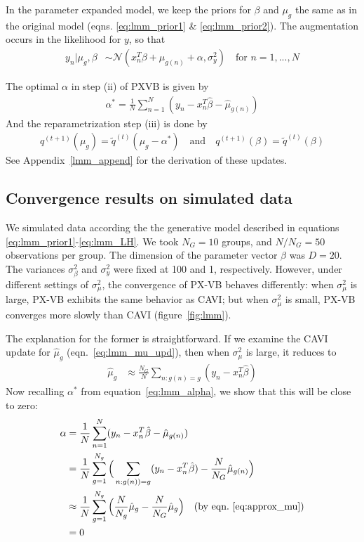\documentclass{article}
\begin{document}
In the parameter expanded model, we keep the priors for $\beta$ and $\mu_g$ the same as in the original model (eqns. \ref{eq:lmm_prior1} \& \ref{eq:lmm_prior2}). The augmentation occurs in the likelihood for $y$, so that
\begin{align}
y_n | \mu_g, \beta &\sim \mathcal N (x_n^T\beta + \mu_{g(n)}+\alpha, \sigma^2_y)\quad \text{for $n = 1, ..., N$} 
\end{align}

The optimal $\alpha$ in step (ii) of PXVB is given by 
\begin{align}
\alpha^* =  \frac{1}{N}\sum_{n=1}^N (y_n - x_n^T\hat\beta - \hat\mu_{g(n)}) \label{eq:lmm_alpha}
\end{align}
And the reparametrization step (iii) is done by 
\begin{align}
    q^{(t+1)}(\mu_g) = \tilde q^{(t)}(\mu_g-\alpha^*) \quad \text{and} \quad q^{(t+1)}(\beta) = \tilde q^{(t)}(\beta)
\end{align}
See Appendix~\ref{lmm_append} for the derivation of these updates. 



\subsection{Convergence results on simulated data}
We simulated data according the the generative model described in equations \ref{eq:lmm_prior1}-\ref{eq:lmm_LH}. We took $N_G = 10$ groups, and $N/N_G = 50$ observations per group. The dimension of the parameter vector $\beta$ was $D = 20$. The variances $\sigma^2_\beta$ and $\sigma^2_y$ were fixed at 100 and 1, respectively. However, under different settings of $\sigma^2_\mu$, the convergence of PX-VB behaves differently: when $\sigma^2_\mu$ is large, PX-VB exhibits the same behavior as CAVI; but when $\sigma^2_\mu$ is small, PX-VB converges more slowly than CAVI (figure~\ref{fig:lmm}). 

The explanation for the former is straightforward. If we examine the CAVI update for $\hat\mu_g$ (eqn.~\ref{eq:lmm_mu_upd}), then when $\sigma^2_\mu$ is large, it reduces to 
\begin{align}
{\hat\mu_g} &\approx \frac{N_G}{N}\sum_{n: g(n) = g} (y_n - x_n^T\hat\beta) \label{eq:approx_mu}
\end{align}
Now recalling $\alpha^*$ from equation~\ref{eq:lmm_alpha}, we show that this will be close to zero: 
\begin{align}
\alpha &= \frac{1}{N} \sum_{n=1}^N (y_n - x_n^T \hat\beta - \hat\mu_{g(n)})\\
    &= \frac{1}{N} \sum_{g=1}^{N_g} \Big(\sum_{n: g(n)) = g} (y_n - x_n^T \hat\beta)- \frac{N}{N_G}\hat\mu_{g(n)}\Big) \\
    &\approx \frac{1}{N} \sum_{g=1}^{N_g} \Big(\frac{N}{N_g}\hat\mu_g - \frac{N}{N_G}\hat\mu_{g}\Big) \quad \text{(by eqn.~\ref{eq:approx_mu})}\\
    &= 0
\end{align}
\end{document}
